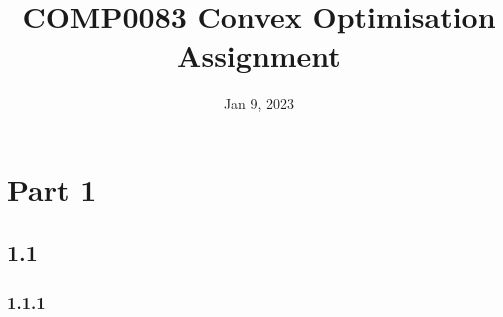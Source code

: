 \documentclass[12pt]{article}
\title{\textbf{COMP0083 Convex Optimisation Assignment}}
\date{Jan 9, 2023}
\begin{document}
\maketitle
\section*{Part 1}
\subsection*{1.1}
\subsubsection*{1.1.1}
\end{document}
